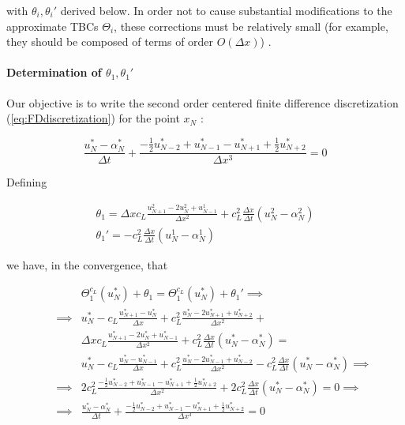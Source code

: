 \noindent with $\theta_i, \theta_i'$ derived below. In order not to cause substantial modifications to the approximate TBCs $\Theta_i$, these corrections must be relatively small (for example, they should be composed of terms of order $O(\Delta x)$) .

\paragraph{Determination of $\theta_1, \theta_1'$}

\indent Our objective is to write the second order centered finite difference discretization (\ref{eq:FDdiscretization}) for the point $x_{N}$ :

\begin{equation*}
    \label{eq:FDdiscretizationN}
    \frac{u_{N}^* - \alpha_{N}^*}{\Delta t} + \frac{-\frac{1}{2}u_{N-2}^* + u_{N-1}^* - u_{N+1}^* + \frac{1}{2}u_{N+2}^* }{\Delta x ^3} = 0
\end{equation*}

\indent Defining 

\begin{gather*}
    \theta_1 = \Delta x c_L \frac{u_{N+1}^2 - 2u_{N}^2 + u_{N-1}^1}{\Delta x^2} + c_L^2\frac{\Delta x}{\Delta t} \left( u_{N}^2 - \alpha_{N}^2 \right)\\
    \theta_1' = - c_L^2\frac{\Delta x}{\Delta t} \left( u_{N}^1 - \alpha_{N}^1 \right)
\end{gather*}

\indent we have, in the convergence, that

\begin{equation*}
\label{eq:modifiedTBC1}
\begin{aligned}
&& &    \Theta_1^{c_L}(u_N^*) + \theta_1 = \Theta_1^{c_L}(u_N^*) + \theta_1'\implies \\
&& \implies &    u_N^* - c_L \frac{u_{N+1}^* - u_N^*}{\Delta x} + c_L^2\frac{u_N^* - 2u_{N+1}^* + u_{N+2}^*}{\Delta x^2} + \\ 
&& & \Delta x c_L \frac{u_{N+1}^* - 2u_{N}^* + u_{N-1}^*}{\Delta x^2} + c_L^2\frac{\Delta x}{\Delta t} \left( u_{N}^* - \alpha_{N}^* \right) = \\
&& & u_N^* - c_L \frac{u_{N}^* - u_{N-1}^*}{\Delta x} + c_L^2\frac{u_N^* - 2u_{N-1}^* + u_{N-2}^*}{\Delta x^2}  - c_L^2\frac{\Delta x}{\Delta t} \left( u_{N}^* - \alpha_{N}^* \right) \implies \\
 && \implies &    2c_L^2 \frac{-\frac{1}{2}u_{N-2}^* + u_{N-1}^* - u_{N+1}^* + \frac{1}{2}u_{N+2}^* }{\Delta x ^2}  +             2c_L^2\frac{\Delta x}{\Delta t} \left( u_{N}^* - \alpha_{N}^* \right) = 0 \implies \\
&& \implies &    \frac{u_{N}^* - \alpha_{N}^*}{\Delta t} + \frac{-\frac{1}{2}u_{N-2}^* + u_{N-1}^* - u_{N+1}^* + \frac{1}{2}u_{N+2}^* }{\Delta x ^3} = 0
\end{aligned}
\end{equation*}

